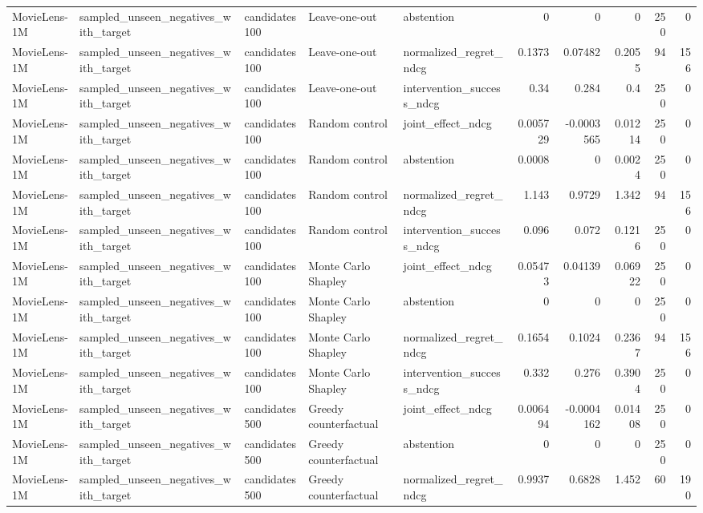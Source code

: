 \begin{table}[t]
{\begin{tabular}{lllllrrrrr}
MovieLens-1M & sampled\_unseen\_negatives\_with\_target & candidates100 & Leave-one-out & abstention & 0 & 0 & 0 & 250 & 0 \\
MovieLens-1M & sampled\_unseen\_negatives\_with\_target & candidates100 & Leave-one-out & normalized\_regret\_ndcg & 0.1373 & 0.07482 & 0.2055 & 94 & 156 \\
MovieLens-1M & sampled\_unseen\_negatives\_with\_target & candidates100 & Leave-one-out & intervention\_success\_ndcg & 0.34 & 0.284 & 0.4 & 250 & 0 \\
MovieLens-1M & sampled\_unseen\_negatives\_with\_target & candidates100 & Random control & joint\_effect\_ndcg & 0.005729 & -0.0003565 & 0.01214 & 250 & 0 \\
MovieLens-1M & sampled\_unseen\_negatives\_with\_target & candidates100 & Random control & abstention & 0.0008 & 0 & 0.0024 & 250 & 0 \\
MovieLens-1M & sampled\_unseen\_negatives\_with\_target & candidates100 & Random control & normalized\_regret\_ndcg & 1.143 & 0.9729 & 1.342 & 94 & 156 \\
MovieLens-1M & sampled\_unseen\_negatives\_with\_target & candidates100 & Random control & intervention\_success\_ndcg & 0.096 & 0.072 & 0.1216 & 250 & 0 \\
MovieLens-1M & sampled\_unseen\_negatives\_with\_target & candidates100 & Monte Carlo Shapley & joint\_effect\_ndcg & 0.05473 & 0.04139 & 0.06922 & 250 & 0 \\
MovieLens-1M & sampled\_unseen\_negatives\_with\_target & candidates100 & Monte Carlo Shapley & abstention & 0 & 0 & 0 & 250 & 0 \\
MovieLens-1M & sampled\_unseen\_negatives\_with\_target & candidates100 & Monte Carlo Shapley & normalized\_regret\_ndcg & 0.1654 & 0.1024 & 0.2367 & 94 & 156 \\
MovieLens-1M & sampled\_unseen\_negatives\_with\_target & candidates100 & Monte Carlo Shapley & intervention\_success\_ndcg & 0.332 & 0.276 & 0.3904 & 250 & 0 \\
MovieLens-1M & sampled\_unseen\_negatives\_with\_target & candidates500 & Greedy counterfactual & joint\_effect\_ndcg & 0.006494 & -0.0004162 & 0.01408 & 250 & 0 \\
MovieLens-1M & sampled\_unseen\_negatives\_with\_target & candidates500 & Greedy counterfactual & abstention & 0 & 0 & 0 & 250 & 0 \\
MovieLens-1M & sampled\_unseen\_negatives\_with\_target & candidates500 & Greedy counterfactual & normalized\_regret\_ndcg & 0.9937 & 0.6828 & 1.452 & 60 & 190 \\

\end{tabular}}
\end{table}
